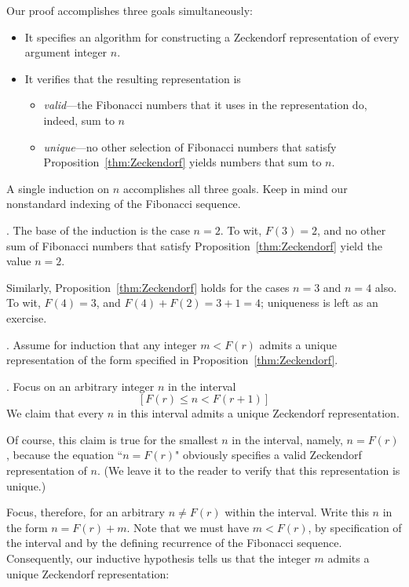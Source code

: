 Our proof accomplishes three goals simultaneously:
\begin{itemize}
\item
It specifies an algorithm for constructing a Zeckendorf representation of every argument integer $n$.
\item
It verifies that the resulting representation is
  \begin{itemize}
  \item
{\em valid}---the Fibonacci numbers that it uses in the representation do, indeed, sum to $n$
  \item
{\em unique}---no other selection of Fibonacci numbers that satisfy Proposition~\ref{thm:Zeckendorf} yields numbers that sum to $n$.
  \end{itemize}
\end{itemize}
A single induction on $n$ accomplishes all three goals.  Keep in mind our nonstandard indexing of the Fibonacci sequence.

\smallskip

.
The base of the induction is the case $n=2$.  To wit, $F(3) = 2$, and no other sum of Fibonacci numbers that satisfy Proposition~\ref{thm:Zeckendorf} yield the value $n=2$.

Similarly, Proposition~\ref{thm:Zeckendorf} holds for the cases $n=3$ and $n=4$ also.  To wit, $F(4) = 3$, and $F(4) + F(2) = 3 + 1 = 4$; uniqueness is left as an exercise.

\smallskip

.
Assume for induction that any integer $m < F(r)$ admits a unique representation of the form specified in Proposition~\ref{thm:Zeckendorf}.

\smallskip

.
Focus on an arbitrary integer $n$ in the interval
\[ [F(r) \leq n < F(r+1)] \]
We claim that every $n$ in this interval admits a unique Zeckendorf representation.

Of course, this claim is true for the smallest $n$ in the interval, namely, $n=F(r)$, because the equation ``$n=F(r)$" obviously specifies a valid Zeckendorf representation of $n$.  (We leave it to the reader to verify that this representation is unique.)

Focus, therefore, for an arbitrary $n \neq F(r)$ within the interval.  Write this $n$ in the form $n = F(r) + m$.  Note that we must have $m < F(r)$, by specification of the interval and by the defining recurrence of the Fibonacci sequence.  Consequently, our inductive hypothesis tells us that the integer $m$ admits a unique Zeckendorf representation:

